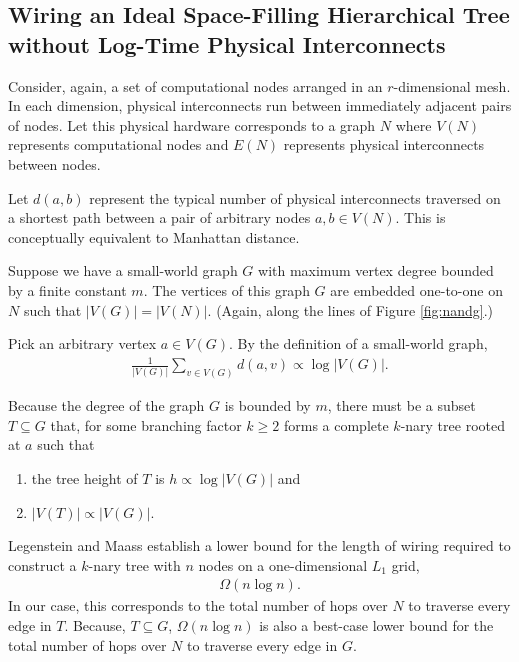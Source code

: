 \subsection{Wiring an Ideal Space-Filling Hierarchical Tree without Log-Time Physical Interconnects} \label{sec:proof2}

Consider, again, a set of computational nodes arranged in an $r$-dimensional mesh.
In each dimension, physical interconnects run between immediately adjacent pairs of nodes.
Let this physical hardware corresponds to a graph $N$ where $V(N)$ represents computational nodes and $E(N)$ represents physical interconnects between nodes.

Let $d(a,b)$ represent the typical number of physical interconnects traversed on a shortest path between a pair of arbitrary nodes $a, b \in V(N)$.
This is conceptually equivalent to Manhattan distance.

Suppose we have a small-world graph $G$ with maximum vertex degree bounded by a finite constant $m$.
The vertices of this graph $G$ are embedded one-to-one on $N$ such that $|V(G)| = |V(N)|$.
(Again, along the lines of Figure \ref{fig:nandg}.)


Pick an arbitrary vertex $a \in V(G)$.
By the definition of a small-world graph,
\begin{align*}
  \frac{1}{|V(G)|} \sum_{v \in V(G)} d(a, v) \propto \log |V(G)|.
\end{align*}

Because the degree of the graph $G$ is bounded by $m$, there must be a subset $T \subseteq G$ that, for some branching factor $k \geq 2$ forms a complete $k$-nary tree rooted at $a$ such that
\begin{enumerate}
  \item the tree height of $T$ is $h \propto \log |V(G)|$ and
  \item $|V(T)| \propto |V(G)|$.
\end{enumerate}

Legenstein and Maass \citep{legenstein2001optimizing} establish a lower bound for the length of wiring required to construct a $k$-nary tree with $n$ nodes on a one-dimensional $L_1$ grid,
\begin{align*}
\Omega(n \log n).
\end{align*}
In our case, this corresponds to the total number of hops over $N$ to traverse every edge in $T$.
Because, $T \subseteq G$, $\Omega(n \log n)$ is also a best-case lower bound for the total number of hops over $N$ to traverse every edge in $G$.

